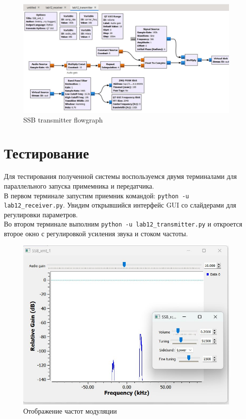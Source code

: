 \documentclass{article}
\begin{document}
\begin{figure}[H]
\centering
\includegraphics[width=\textwidth]{ssb_transmitter_flowgraph.jpg}
\caption{SSB transmitter flowgraph}
\end{figure}

\section{Тестирование}

Для тестирования полученной системы воспользуемся двумя терминалами для параллельного запуска примемника и передатчика.\\

В первом терминале запустим приемник командой: \texttt{python -u lab12\_receiver.py}. Увидим открывшийся интерфейс GUI со слайдерами для регулировки параметров.\\

Во втором терминале выполним \texttt{python -u lab12\_transmitter.py} и откроется второе окно с регулировкой усиления звука и стоком частоты.\\
\vspace{1cm}

\begin{figure}[H]
\centering
\includegraphics[width=\textwidth]{ssb_test}
\caption{Отображение частот модуляции}
\end{figure}
\end{document}
